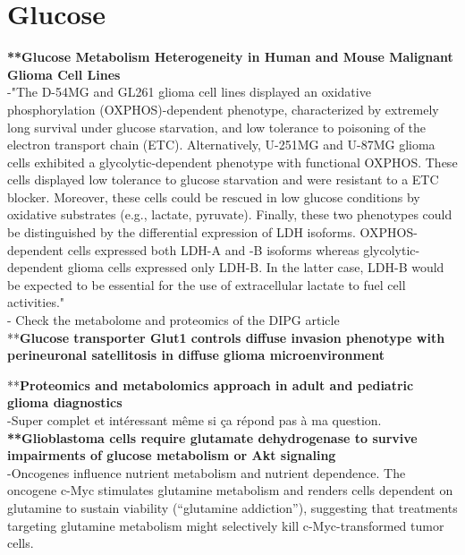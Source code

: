 \documentclass[11pt,a4paper]{article}
\begin{document}
\section{Glucose}
\textbf{**Glucose Metabolism Heterogeneity in Human and Mouse Malignant Glioma Cell Lines}\\

-"The D-54MG and GL261 glioma cell lines displayed an oxidative phosphorylation (OXPHOS)-dependent phenotype, characterized by extremely long survival under glucose starvation, and low tolerance to poisoning of the electron transport chain (ETC). Alternatively, U-251MG and U-87MG glioma cells exhibited a glycolytic-dependent phenotype with functional OXPHOS. These cells displayed low tolerance to glucose starvation and were resistant to a ETC blocker. Moreover, these cells could be rescued in low glucose conditions by oxidative substrates (e.g., lactate, pyruvate). Finally, these two phenotypes could be distinguished by the differential expression of LDH isoforms. OXPHOS-dependent cells expressed both LDH-A and -B isoforms whereas glycolytic-dependent glioma cells expressed only LDH-B. In the latter case, LDH-B would be expected to be essential for the use of extracellular lactate to fuel cell activities."\\

- Check the metabolome and proteomics of the DIPG article\\

**\textbf{Glucose transporter Glut1 controls diffuse invasion phenotype with perineuronal satellitosis in diffuse glioma microenvironment}


**\textbf{Proteomics and metabolomics approach in adult and pediatric glioma diagnostics}\\

-Super complet et intéressant même si ça répond pas à ma question.\\


\textbf{**Glioblastoma cells require glutamate dehydrogenase to survive impairments of glucose metabolism or Akt signaling}\\

-Oncogenes influence nutrient metabolism and nutrient dependence. The oncogene c-Myc stimulates glutamine metabolism and renders cells dependent on glutamine to sustain viability (“glutamine addiction”), suggesting that treatments targeting glutamine metabolism might selectively kill c-Myc-transformed tumor cells.\\
\end{document}
